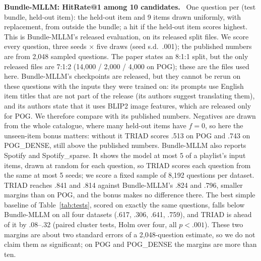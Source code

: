 \documentclass[runningheads]{llncs}
\renewcommand{\paragraph}[1]{\smallskip\noindent\textbf{#1}\ }
\begin{document}
\paragraph{Bundle-MLLM: HitRate@1 among 10 candidates.} One question per (test bundle, held-out item): the held-out
item and 9 items drawn uniformly, with replacement, from outside the bundle; a hit if the held-out item scores highest.
This is Bundle-MLLM's released evaluation, on its released split files. We score every question, three seeds
$\times$ five draws (seed s.d.\ .001); the published numbers are from 2,048 sampled questions. The paper states an
8:1:1 split, but the only released files are 7:1:2 (14,000 / 2,000 / 4,000 on POG); these are the files used here.
Bundle-MLLM's checkpoints are released, but they cannot be rerun on these questions with the inputs they were
trained on: its prompts use English item titles that are not part of the release (its authors suggest translating
them), and its authors state that it uses BLIP2 image features, which are released only for POG. We therefore compare
with its published numbers. Negatives are drawn from the whole catalogue, where many held-out items have $f=0$, so here the unseen-item bonus
matters: without it TRIAD scores .513 on POG and .743 on POG\_DENSE, still above the published numbers. Bundle-MLLM
also reports Spotify and Spotify\_sparse. It shows the model at most 5 of a playlist's input items, drawn at random for each question, so TRIAD scores each question from the same at most 5
seeds; we score a fixed sample of 8,192 questions per dataset. TRIAD reaches .841 and .814 against Bundle-MLLM's .824
and .796, smaller margins than on POG, and the bonus makes no difference there. The best simple baseline of
Table~\ref{tab:tests}, scored on exactly the same questions, falls below Bundle-MLLM on all four datasets (.617, .306,
.641, .759), and TRIAD is ahead of it by .08--.32 (paired cluster tests, Holm over four, all $p<.001$). These two margins are about two
standard errors of a 2,048-question estimate, so we do not claim them as significant; on POG and POG\_DENSE the
margins are more than ten.
\end{document}
